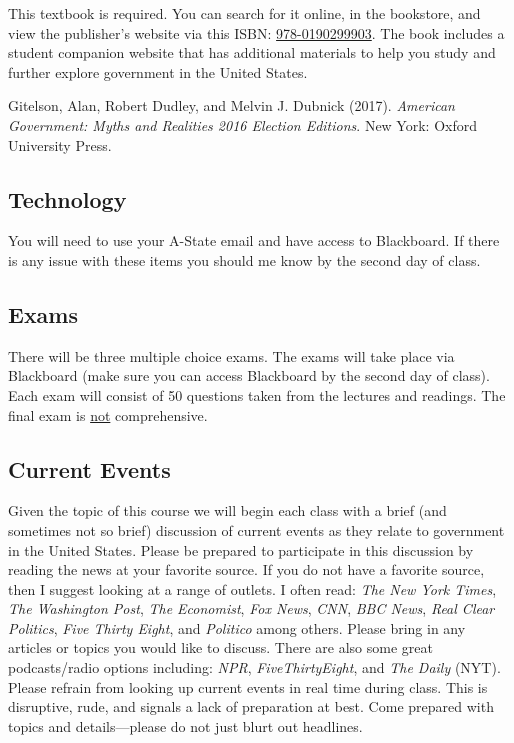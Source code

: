 \documentclass[11pt,]{article}
\begin{document}
This textbook is required. You can search for it online, in the
bookstore, and view the publisher's website via this ISBN:
\href{http://global.oup.com/ushe/product/american-government-9780190299903}{978-0190299903}.
The book includes a student companion website that has additional
materials to help you study and further explore government in the United
States.

\hangindent=0.7cm

Gitelson, Alan, Robert Dudley, and Melvin J. Dubnick (2017).
\emph{American Government: Myths and Realities 2016 Election Editions}.
New York: Oxford University Press.

\hypertarget{technology}{%
\subsection{Technology}\label{technology}}

You will need to use your A-State email and have access to Blackboard.
If there is any issue with these items you should me know by the second
day of class.

\hypertarget{exams}{%
\subsection{Exams}\label{exams}}

There will be three multiple choice exams. The exams will take place via
Blackboard (make sure you can access Blackboard by the second day of
class). Each exam will consist of 50 questions taken from the lectures
and readings. The final exam is \underline{not} comprehensive.

\hypertarget{current-events}{%
\subsection{Current Events}\label{current-events}}

Given the topic of this course we will begin each class with a brief
(and sometimes not so brief) discussion of current events as they relate
to government in the United States. Please be prepared to participate in
this discussion by reading the news at your favorite source. If you do
not have a favorite source, then I suggest looking at a range of
outlets. I often read: \emph{The New York Times}, \emph{The Washington
Post}, \emph{The Economist}, \emph{Fox News}, \emph{CNN}, \emph{BBC
News}, \emph{Real Clear Politics}, \emph{Five Thirty Eight}, and
\emph{Politico} among others. Please bring in any articles or topics you
would like to discuss. There are also some great podcasts/radio options
including: \emph{NPR}, \emph{FiveThirtyEight}, and \emph{The Daily}
(NYT). Please refrain from looking up current events in real time during
class. This is disruptive, rude, and signals a lack of preparation at
best. Come prepared with topics and details---please do not just blurt
out headlines.
\end{document}
